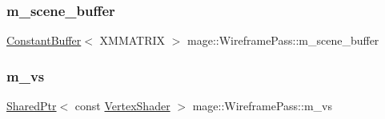 \hypertarget{classmage_1_1_wireframe_pass_a09db50fcfc6b48247d3075531c5189a6}{}\label{classmage_1_1_wireframe_pass_a09db50fcfc6b48247d3075531c5189a6} 
\subsubsection{\texorpdfstring{m\+\_\+scene\+\_\+buffer}{m\_scene\_buffer}}
{\footnotesize\ttfamily \hyperlink{structmage_1_1_constant_buffer}{Constant\+Buffer}$<$ X\+M\+M\+A\+T\+R\+IX $>$ mage\+::\+Wireframe\+Pass\+::m\+\_\+scene\+\_\+buffer\hspace{0.3cm}{\ttfamily [private]}}

\hypertarget{classmage_1_1_wireframe_pass_a05b72753672603e749b7321d01b00b66}{}\label{classmage_1_1_wireframe_pass_a05b72753672603e749b7321d01b00b66} 
\subsubsection{\texorpdfstring{m\+\_\+vs}{m\_vs}}
{\footnotesize\ttfamily \hyperlink{namespacemage_a1e01ae66713838a7a67d30e44c67703e}{Shared\+Ptr}$<$ const \hyperlink{classmage_1_1_vertex_shader}{Vertex\+Shader} $>$ mage\+::\+Wireframe\+Pass\+::m\+\_\+vs\hspace{0.3cm}{\ttfamily [private]}}

